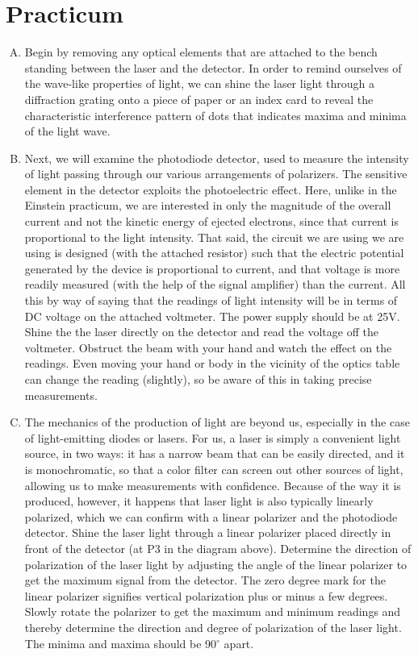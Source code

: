 \section*{Practicum}

\begin{enumerate}[(A)]
	\item Begin by removing any optical elements that are attached to the bench standing between the laser and the detector. In order to remind ourselves of the wave-like properties of light, we can shine the laser light through a diffraction grating onto a piece of paper or an index card to reveal the characteristic interference pattern of dots that indicates maxima and minima of the light wave.

\item Next, we will examine the photodiode detector, used to measure the intensity of light passing through our various arrangements of polarizers. The sensitive element in the detector exploits the photoelectric effect. Here, unlike in the Einstein practicum, we are interested in only the magnitude of the overall current and not the kinetic energy of ejected electrons, since that current is proportional to the light intensity.
That said, the circuit we are using we are using is designed (with the attached resistor) such that the electric potential generated by the device is proportional to current, and that voltage is more readily measured (with the help of the signal amplifier) than the current. All this by way of saying that the readings of light intensity will be in terms of DC voltage on the attached voltmeter. The power supply should be at 25V. Shine the the laser directly on the detector and read the voltage off the voltmeter. Obstruct the beam with your hand and watch the effect on the readings. Even moving your hand or body in the vicinity of the optics table can change the reading (slightly), so be aware of this in taking precise measurements.

\item The mechanics of the production of light are beyond us, especially in the case of light-emitting diodes or lasers. For us, a laser is simply a convenient light source, in two ways: it has a narrow beam that can be easily directed, and it is monochromatic, so that a color filter can screen out other sources of light, allowing us to make measurements with confidence. Because of the way it is produced, however, it happens that laser light is also typically linearly polarized, which we can confirm with a linear polarizer and the photodiode detector. Shine the laser light through a linear polarizer placed directly in front of the detector (at P3 in the diagram above). Determine the direction of polarization of the laser light by adjusting the angle of the linear polarizer to get the maximum signal from the detector.  The zero degree mark for the linear polarizer signifies vertical polarization plus or minus a few degrees.
Slowly rotate the polarizer to get the maximum and minimum readings and thereby determine the direction and degree of polarization of the laser light. The minima and maxima should be 90$^\circ$ apart.



\end{enumerate}
